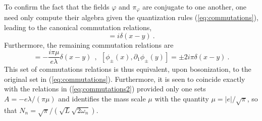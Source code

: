 \documentclass[a4paper,11pt]{article}
\begin{document}
To confirm the fact that the fields $\varphi$ and $\pi_\varphi$ are
conjugate to one another, one need only compute their algebra given the
quantization rules (\ref{eq:commutations}), leading to the canonical 
commutation relations,
\begin{equation}
[\varphi(x),\pi_\varphi(y)]=i\delta(x-y)\ .
\end{equation}
Furthermore, the remaining commutation relations are
\begin{equation}
[\phi_\pm(x),\pi_\varphi(y)]=-\frac{i\pi\mu}{e\lambda}\delta(x-y)\ \ ,\ \ 
[\phi_\pm(x),\partial_1\phi_\pm(y)]=\pm 2i\pi\delta(x-y)\ .
\end{equation}
This set of commutations relations is thus equivalent, upon bosonization,
to the original set in (\ref{eq:commutations}). Furthermore, it is seen
to coincide exactly with the relations in (\ref{eq:commutations2}) provided
only one sets $A=-e\lambda/(\pi\mu)$ and identifies the mass scale $\mu$
with the quantity $\mu=|e|/\sqrt{\pi}$, so that 
$N_n=\sqrt{\pi}/(\sqrt{L}\sqrt{2\omega_n})$. 
\end{document}
